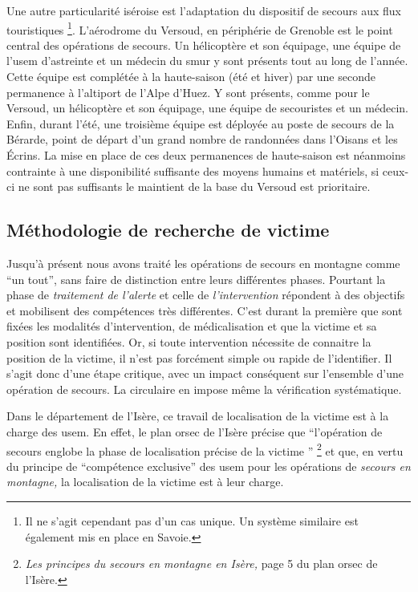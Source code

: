 Une autre particularité iséroise est l'adaptation du dispositif de
secours aux flux touristiques \footnote{Il ne s'agit cependant pas
  d'un cas unique. Un système similaire est également mis en place en
  Savoie.}. L'aérodrome du Versoud, en périphérie de Grenoble est le
point central des opérations de secours. Un hélicoptère et son
équipage, une équipe de l'\ac{usem} d'astreinte et un médecin du
\ac{smur} y sont présents tout au long de l'année. Cette équipe est
complétée à la haute-saison (été et hiver) par une seconde permanence
à l'altiport de l'Alpe d'Huez. Y sont présents, comme pour le Versoud,
un hélicoptère et son équipage, une équipe de secouristes et un
médecin. Enfin, durant l'été, une troisième équipe est déployée au
poste de secours de la Bérarde, point de départ d'un grand nombre de
randonnées dans l'Oisans et les Écrins. La mise en place de ces deux
permanences de haute-saison est néanmoins contrainte à une
disponibilité suffisante des moyens humains et matériels, si ceux-ci ne
sont pas suffisants le maintient de la base du Versoud est
prioritaire.

\subsection{Méthodologie de recherche de victime}
\label{susec:1-1-2}

Jusqu'à présent nous avons traité les opérations de secours en
montagne comme \enquote{un tout}, sans faire de distinction entre
leurs différentes phases.
%
Pourtant la phase de \emph{traitement de l'alerte} et celle de
\emph{l'intervention} répondent à des objectifs et mobilisent des
compétences très différentes. C'est durant la première que sont fixées
les modalités d'intervention, de médicalisation et que la victime et
sa position sont identifiées. Or, si toute intervention nécessite de
connaitre la position de la victime, il n'est pas forcément simple ou
rapide de l'identifier. Il s'agit donc d'une étape critique, avec un
impact conséquent sur l'ensemble d'une opération de secours. La
circulaire  en impose même la vérification systématique.

Dans le département de l'Isère, ce travail de localisation de la
victime est à la charge des \ac{usem}. En effet, le plan \ac{orsec} de
l'Isère précise que \enquote{l’opération de secours \textelp{} englobe
  la phase de localisation précise de la victime \textelp{}}
\footnote{\emph{Les principes du secours en montagne en Isère,} page 5
  du plan \ac{orsec} de l'Isère.} et que, en vertu du principe de
\enquote{compétence exclusive} des \ac{usem} pour les opérations de
\emph{secours en montagne,} la localisation de la victime est à leur
charge.


